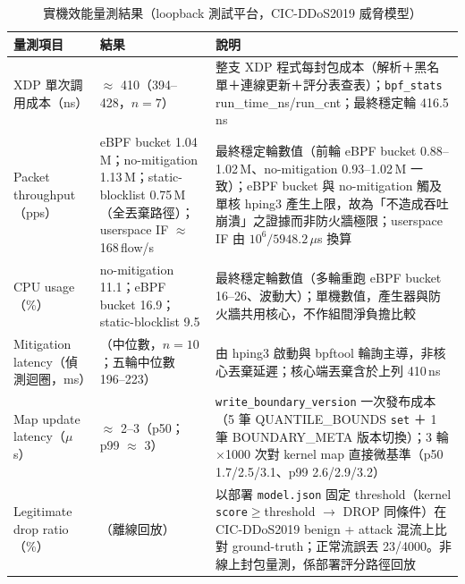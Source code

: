 \documentclass[12pt, a4paper, fontset=none]{ctexart}
\newcommand{\code}[1]{\texttt{#1}}
\begin{document}
\begin{table}[H]
  \centering
  \caption{實機效能量測結果（loopback 測試平台，CIC-DDoS2019 威脅模型）}
  \label{tab:hardware-perf-plan}
  \small
  \renewcommand{\arraystretch}{1.3}
  \setlength{\tabcolsep}{4pt}
  \begin{tabularx}{\textwidth}{%
      >{\raggedright\arraybackslash}p{}%
      >{\raggedright\arraybackslash\hsize=0.85\hsize}X%
      >{\raggedright\arraybackslash\hsize=1.15\hsize}X}
    \toprule
    \textbf{量測項目} & \textbf{結果} & \textbf{說明} \\
    \midrule
    XDP 單次調用成本（ns） & $\approx$ 410（394--428，$n=7$） & 整支 XDP 程式每封包成本（解析＋黑名單＋連線更新＋評分表查表）；\code{bpf\_stats} run\_time\_ns/run\_cnt；最終穩定輪 416.5\,ns \\
    Packet throughput（pps） & eBPF bucket 1.04\,M；no-mitigation 1.13\,M；static-blocklist 0.75\,M（全丟棄路徑）；userspace IF $\approx$ 168\,flow/s & 最終穩定輪數值（前輪 eBPF bucket 0.88--1.02\,M、no-mitigation 0.93--1.02\,M 一致）；eBPF bucket 與 no-mitigation 觸及單核 hping3 產生上限，故為「不造成吞吐崩潰」之證據而非防火牆極限；userspace IF 由 $10^6/5948.2\,\mu$s 換算 \\
    CPU usage（\%） & no-mitigation 11.1；eBPF bucket 16.9；static-blocklist 9.5 & 最終穩定輪數值（多輪重跑 eBPF bucket 16--26、波動大）；單機數值，產生器與防火牆共用核心，不作組間淨負擔比較 \\
    Mitigation latency（偵測迴圈，ms） & 218（中位數，$n=10$；五輪中位數 196--223） & 由 hping3 啟動與 bpftool 輪詢主導，非核心丟棄延遲；核心端丟棄含於上列 410\,ns \\
    Map update latency（$\mu$s） & $\approx$ 2--3（p50；p99 $\approx$ 3） & \code{write\_boundary\_version} 一次發布成本（5 筆 QUANTILE\_BOUNDS \code{set} ＋ 1 筆 BOUNDARY\_META 版本切換）；3 輪 $\times$1000 次對 kernel map 直接微基準（p50 1.7/2.5/3.1、p99 2.6/2.9/3.2） \\
    Legitimate drop ratio（\%） & 0.57（離線回放） & 以部署 \code{model.json} 固定 threshold（kernel \code{score}$\geq$threshold $\to$ DROP 同條件）在 CIC-DDoS2019 benign + attack 混流上比對 ground-truth；正常流誤丟 23/4000。非線上封包量測，係部署評分路徑回放 \\
    \bottomrule
  \end{tabularx}
\end{table}
\end{document}
